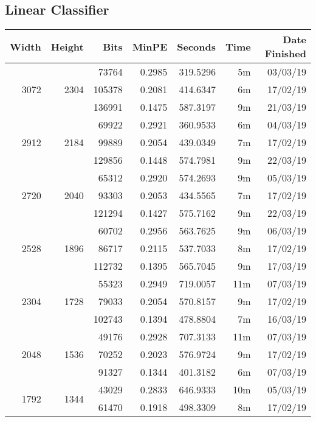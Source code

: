 \subsection{Linear Classifier}
  \begin{center}
  \begin{tabular}{ r r r | r | r r r }
  Width & Height & Bits & MinPE & Seconds & Time & Date Finished \\ \hline
  \multirow{3}{*}{3072} & \multirow{3}{*}{2304} & 73764 & 0.2985 & 319.5296 & 5m & 03/03/19 \\
  & & 105378 & 0.2081 & 414.6347 & 6m & 17/02/19 \\
  & & 136991 & 0.1475 & 587.3197 & 9m & 21/03/19 \\
  \hline
  \multirow{3}{*}{2912} & \multirow{3}{*}{2184} & 69922 & 0.2921 & 360.9533 & 6m & 04/03/19 \\
  & & 99889 & 0.2054 & 439.0349 & 7m & 17/02/19 \\
  & & 129856 & 0.1448 & 574.7981 & 9m & 22/03/19 \\
  \hline
  \multirow{3}{*}{2720} & \multirow{3}{*}{2040} & 65312 & 0.2920 & 574.2693 & 9m & 05/03/19 \\
  & & 93303 & 0.2053 & 434.5565 & 7m & 17/02/19 \\
  & & 121294 & 0.1427 & 575.7162 & 9m & 22/03/19 \\
  \hline
  \multirow{3}{*}{2528} & \multirow{3}{*}{1896} & 60702 & 0.2956 & 563.7625 & 9m & 06/03/19 \\
  & & 86717 & 0.2115 & 537.7033 & 8m & 17/02/19 \\
  & & 112732 & 0.1395 & 565.7045 & 9m & 17/03/19 \\
  \hline
  \multirow{3}{*}{2304} & \multirow{3}{*}{1728} & 55323 & 0.2949 & 719.0057 & 11m & 07/03/19 \\
  & & 79033 & 0.2054 & 570.8157 & 9m & 17/02/19 \\
  & & 102743 & 0.1394 & 478.8804 & 7m & 16/03/19 \\
  \hline
  \multirow{3}{*}{2048} & \multirow{3}{*}{1536} & 49176 & 0.2928 & 707.3133 & 11m & 07/03/19 \\
  & & 70252 & 0.2023 & 576.9724 & 9m & 17/02/19 \\
  & & 91327 & 0.1344 & 401.3182 & 6m & 07/03/19 \\
  \hline
  \multirow{3}{*}{1792} & \multirow{3}{*}{1344} & 43029 & 0.2833 & 646.9333 & 10m & 05/03/19 \\
  & & 61470 & 0.1918 & 498.3309 & 8m & 17/02/19 \\

\end{tabular}
\end{center}
